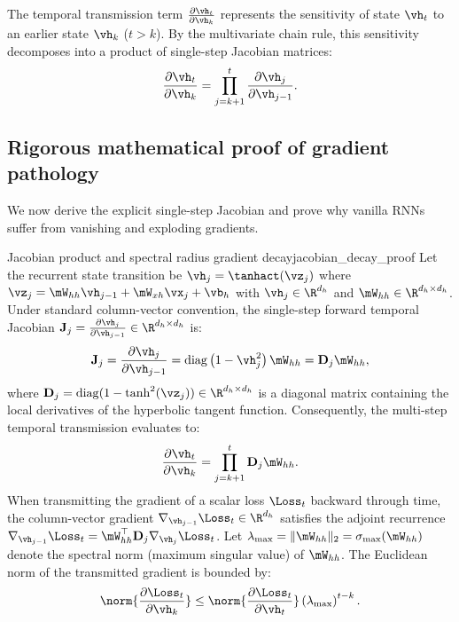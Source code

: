 \documentclass[../../main.tex]{subfiles}
\begin{document}
The temporal transmission term $\frac{\partial \vh_t}{\partial \vh_k}$ represents the sensitivity of state $\vh_t$ to an earlier state $\vh_k$ ($t > k$). By the multivariate chain rule, this sensitivity decomposes into a product of single-step Jacobian matrices:
\begin{equation}
\label{eq:temporal_jacobian_product}
\frac{\partial \vh_t}{\partial \vh_k} = \prod_{j=k+1}^t \frac{\partial \vh_j}{\partial \vh_{j-1}}.
\end{equation}

\subsection{Rigorous mathematical proof of gradient pathology}
We now derive the explicit single-step Jacobian and prove why vanilla RNNs suffer from vanishing and exploding gradients.

\begin{theorem}{Jacobian product and spectral radius gradient decay}{jacobian_decay_proof}
Let the recurrent state transition be $\vh_j = \tanhact(\vz_j)$ where $\vz_j = \mW_{hh} \vh_{j-1} + \mW_{xh} \vx_j + \vb_h$ with $\vh_j \in \R^{d_h}$ and $\mW_{hh} \in \R^{d_h \times d_h}$.
Under standard column-vector convention, the single-step forward temporal Jacobian $\mathbf{J}_j = \frac{\partial \vh_j}{\partial \vh_{j-1}} \in \R^{d_h \times d_h}$ is:
\begin{equation}
\label{eq:single_step_jacobian}
\mathbf{J}_j = \frac{\partial \vh_j}{\partial \vh_{j-1}} = \operatorname{diag}\left( 1 - \vh_j^2 \right) \mW_{hh} = \mathbf{D}_j \mW_{hh},
\end{equation}
where $\mathbf{D}_j = \operatorname{diag}(1 - \tanh^2(\vz_j)) \in \R^{d_h \times d_h}$ is a diagonal matrix containing the local derivatives of the hyperbolic tangent function. Consequently, the multi-step temporal transmission evaluates to:
\begin{equation}
\label{eq:full_chain_product}
\frac{\partial \vh_t}{\partial \vh_k} = \prod_{j=k+1}^t \mathbf{D}_j \mW_{hh}.
\end{equation}
When transmitting the gradient of a scalar loss $\Loss_t$ backward through time, the column-vector gradient $\nabla_{\vh_{j-1}} \Loss_t \in \R^{d_h}$ satisfies the adjoint recurrence $\nabla_{\vh_{j-1}} \Loss_t = \mW_{hh}^\top \mathbf{D}_j \nabla_{\vh_j} \Loss_t$.
Let $\lambda_{\max} = \|\mW_{hh}\|_2 = \sigma_{\max}(\mW_{hh})$ denote the spectral norm (maximum singular value) of $\mW_{hh}$. The Euclidean norm of the transmitted gradient is bounded by:
\begin{equation}
\label{eq:gradient_bound}
\norm{\frac{\partial \Loss_t}{\partial \vh_k}} \le \norm{\frac{\partial \Loss_t}{\partial \vh_t}} \left( \lambda_{\max} \right)^{t-k}.
\end{equation}
\end{theorem}
\end{document}
